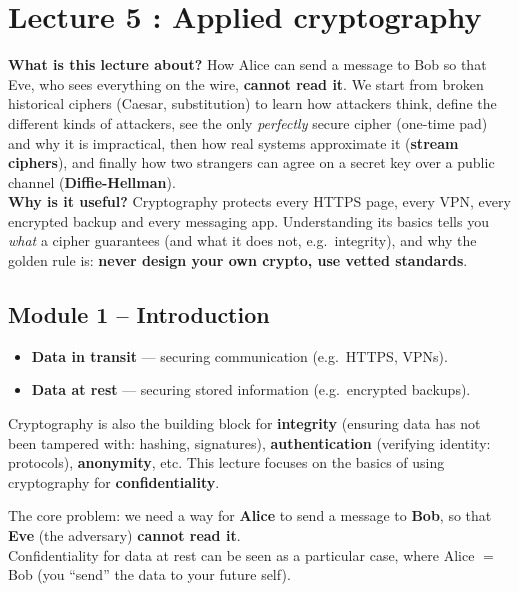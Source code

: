 \chapter{Lecture 5 : Applied cryptography}

\begin{rembox}[title=In a nutshell]
\textbf{What is this lecture about?} How Alice can send a message to Bob so that Eve,
who sees everything on the wire, \textbf{cannot read it}. We start from broken historical
ciphers (Caesar, substitution) to learn how attackers think, define the different kinds
of attackers, see the only \emph{perfectly} secure cipher (one-time pad) and why it is
impractical, then how real systems approximate it (\textbf{stream ciphers}), and finally
how two strangers can agree on a secret key over a public channel
(\textbf{Diffie-Hellman}). \\
\textbf{Why is it useful?} Cryptography protects every HTTPS page, every VPN, every
encrypted backup and every messaging app. Understanding its basics tells you
\emph{what} a cipher guarantees (and what it does not, e.g.\ integrity), and why the
golden rule is: \textbf{never design your own crypto, use vetted standards}.
\end{rembox}

\section{Module 1 -- Introduction}

\begin{rembox}[title=Why cryptography matters]
\begin{itemize}
  \item \textbf{Data in transit} --- securing communication (e.g.\ HTTPS, VPNs).
  \item \textbf{Data at rest} --- securing stored information (e.g.\ encrypted
        backups).
\end{itemize}
Cryptography is also the building block for \textbf{integrity} (ensuring data has not
been tampered with: hashing, signatures), \textbf{authentication} (verifying identity:
protocols), \textbf{anonymity}, etc. This lecture focuses on the basics of using
cryptography for \textbf{confidentiality}.
\end{rembox}

\begin{defnbox}[title=Secure communication over an insecure channel]
The core problem: we need a way for \textbf{Alice} to send a message to \textbf{Bob},
so that \textbf{Eve} (the adversary) \textbf{cannot read it}. \\
Confidentiality for data at rest can be seen as a particular case, where
Alice $=$ Bob (you ``send'' the data to your future self).
\end{defnbox}

